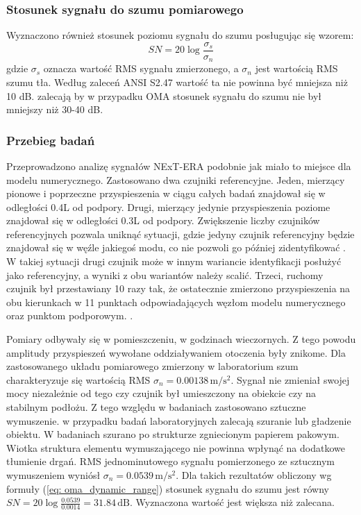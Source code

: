 \subsubsection{Stosunek sygnału do szumu pomiarowego}
Wyznaczono również stosunek poziomu sygnału do szumu posługując się wzorem:
\begin{equation} \label{eq: oma_dynamic_range}
	SN = 20 \log{\frac{\sigma_s}{\sigma_n}}
\end{equation}
gdzie $\sigma_s$ oznacza wartość RMS sygnału zmierzonego, a $\sigma_n$ jest wartością RMS szumu tła. Według zaleceń ANSI S2.47 wartość ta nie powinna być mniejsza niż 10 dB. \cite{Brincker2015} zalecają by w przypadku OMA stosunek sygnału do szumu nie był mniejszy niż 30-40 dB.

\subsubsection{Przebieg badań}
Przeprowadzono analizę sygnałów NExT-ERA podobnie jak miało to miejsce dla modelu numerycznego. Zastosowano dwa czujniki referencyjne. Jeden, mierzący pionowe i poprzeczne przyspieszenia w ciągu całych badań znajdował się w odległości 0.4L od podpory. Drugi, mierzący jedynie przyspieszenia poziome znajdował się w odległości 0.3L od podpory. Zwiększenie liczby czujników referencyjnych pozwala uniknąć sytuacji, gdzie jedyny czujnik referencyjny będzie znajdował się w węźle jakiegoś modu, co nie pozwoli go później zidentyfikować \parencite{Caicedo2011}. W takiej sytuacji drugi czujnik może w innym wariancie identyfikacji posłużyć jako referencyjny, a wyniki z obu wariantów należy scalić. Trzeci, ruchomy czujnik był przestawiany 10 razy tak, że ostatecznie zmierzono przyspieszenia na obu kierunkach w 11 punktach odpowiadających węzłom modelu numerycznego oraz punktom podporowym. . 


Pomiary odbywały się w pomieszczeniu, w godzinach wieczornych. Z tego powodu amplitudy przyspieszeń wywołane oddziaływaniem otoczenia były znikome. Dla zastosowanego układu pomiarowego zmierzony w laboratorium szum charakteryzuje się wartością RMS $\sigma_n=0.00138\,  \text{m}/\text{s}^2$. Sygnał nie zmieniał swojej mocy niezależnie od tego czy czujnik był umieszczony na obiekcie czy na stabilnym podłożu. Z tego względu w badaniach zastosowano sztuczne wymuszenie. \cite{Brincker2015} w przypadku badań laboratoryjnych zalecają szuranie lub gładzenie obiektu. W badaniach szurano po strukturze zgniecionym papierem pakowym. Wiotka struktura elementu wymuszającego nie powinna wpłynąć na dodatkowe tłumienie drgań. RMS jednominutowego sygnału pomierzonego ze sztucznym wymuszeniem wyniósł $\sigma_n=0.0539\,  \text{m}/\text{s}^2$. Dla takich rezultatów obliczony wg formuły (\ref{eq: oma_dynamic_range}) stosunek sygnału do szumu jest równy $SN = 20\log{\frac{0.0539}{0.0014}}=31.84\,\text{dB}$. Wyznaczona wartość jest większa niż zalecana.

